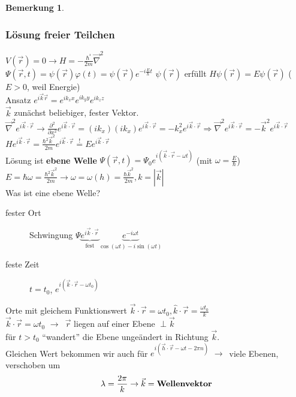 \documentclass[oneside]{book}
\theoremstyle{definition}
\newtheorem*{bemerkung*}{Bemerkung}
\newcommand{\conseq}{$\rightarrow$~}
\newcommand{\ffpartial}[2]{\frac{\partial #1}{\partial #2}}
\newcommand{\vp}{\varphi}
\begin{document}
\begin{bemerkung*}
	\subsubsection{Lösung freier Teilchen}
	$V(\vec{r}) = 0 \rightarrow H = - \frac{\hbar^²}{2m} \vec{\nabla}^2$\\
	$\Psi(\vec{r}, t) = \psi(\vec{r}) \vp(t) = \psi(\vec{r}) e^{- i \frac{E}{\hbar} t}$
	$\psi(\vec{r})$ erfüllt $H\psi(\vec{r}) = E\psi(\vec{r})$ ($E > 0$, weil Energie)\\
	Ansatz $e^{i\vec{k} \vec{r}} = e^{i k_x x} e^{i k_y y} e^{i k_z z}$\\
	$\vec{k}$ zunächst beliebiger, fester Vektor.\\
	$\vec{\nabla}^2 e^{i\vec{k}\cdot \vec{r}} \rightarrow \ffpartial{^2}{x^2} e^{i\vec{k}\cdot \vec{r}} = (ik_x) (i k_x) e^{i\vec{k}\cdot \vec{r}} = -k_x^2 e^{i\vec{k}\cdot \vec{r}} \Rightarrow \vec{\nabla}^2 e^{i\vec{k}\cdot \vec{r}} = - \vec{k}^2 e^{i\vec{k}\cdot \vec{r}}$\\
	$H e^{i\vec{k}\cdot \vec{r}} = \frac{\hbar^2 \vec{k}^2}{2m} e^{i\vec{k}\cdot \vec{r}} \overset{!}{=} E e^{i\vec{k}\cdot \vec{r}}$\\
	Lösung ist \textbf{ebene Welle} $\Psi(\vec{r}, t) = \Psi_0 e^{i (\vec{k} \cdot \vec{r} - \omega t)}$ (mit $\omega = \frac{E}{\hbar}$)\\
	$E = \hbar \omega = \frac{\hbar^2 \vec{k}^2}{2m} \rightarrow \omega = \omega(h) = \frac{\hbar \vec{k}^2}{2m}, k = |\vec{k}|$\\
	Was ist eine ebene Welle?
	\begin{description}
		\item[fester Ort] Schwingung $\Psi \underbrace{e^{i\vec{k} \cdot \vec{r}}}_{\text{fest}} \underbrace{e^{-i\omega t}}_{\cos(\omega t) - i \sin(\omega t)}$
		\item[feste Zeit] $t = t_0$, $e^{i (\vec{k} \cdot \vec{r} - \omega t_0)}$
	\end{description}
	Orte mit gleichem Funktionswert $\vec{k} \cdot \vec{r} = \omega t_0, \hat{k} \cdot \vec{r} = \frac{\omega t_0}{k}$\\
	$\vec{k} \cdot \vec{r} = \omega t_0$ \conseq $\vec{r}$ liegen auf einer Ebene $\perp \vec{k}$\\
	für $t > t_0$ "`wandert"' die Ebene ungeändert in Richtung $\vec{k}$.\\
	Gleichen Wert bekommen wir auch für $e^{i(\vec{h} \cdot \vec{r} - \omega t - 2 \pi n)}$ \conseq viele Ebenen, verschoben um 
	$$\lambda = \frac{2\pi}{k} \rightarrow \vec{k} = \text{\textbf{Wellenvektor}}$$

\end{bemerkung*}
\end{document}
